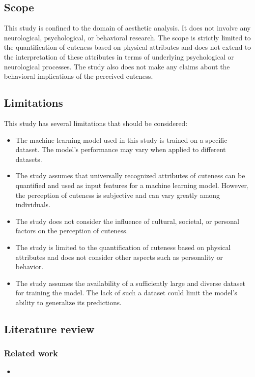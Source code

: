 \documentclass{article}
\begin{document}
\subsection{Scope}
This study is confined to the domain of aesthetic analysis. It does not involve any neurological, psychological, or behavioral research. The scope is strictly limited to the quantification of cuteness based on physical attributes and does not extend to the interpretation of these attributes in terms of underlying psychological or neurological processes. The study also does not make any claims about the behavioral implications of the perceived cuteness.

\subsection{Limitations}
This study has several limitations that should be considered:

\begin{itemize}
    \item The machine learning model used in this study is trained on a specific dataset. The model's performance may vary when applied to different datasets.
    \item The study assumes that universally recognized attributes of cuteness can be quantified and used as input features for a machine learning model. However, the perception of cuteness is subjective and can vary greatly among individuals.
    \item The study does not consider the influence of cultural, societal, or personal factors on the perception of cuteness.
    \item The study is limited to the quantification of cuteness based on physical attributes and does not consider other aspects such as personality or behavior.
    \item The study assumes the availability of a sufficiently large and diverse dataset for training the model. The lack of such a dataset could limit the model's ability to generalize its predictions.
\end{itemize}

\subsection{Literature review}
\subsubsection{Related work}
\begin{itemize}
    \item 
\end{itemize}




\printbibliography
\end{document}
